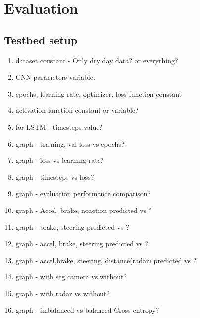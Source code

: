 \chapter{Evaluation}
\section{Testbed setup}
\begin{enumerate}
    \item dataset constant - Only dry day data?
        or everything?
    \item CNN parameters variable.
    \item epochs, learning rate, optimizer, loss function constant
    \item activation function constant or variable?
    \item for LSTM - timesteps value?
    \item graph - training, val loss vs epochs?
    \item graph - loss vs learning rate?
    \item graph - timesteps vs loss?
    \item graph - evaluation performance comparison?
    \item graph - Accel, brake, noaction predicted vs ?
    \item graph - brake, steering predicted vs ?
    \item graph - accel, brake, steering predicted vs ?
    \item graph - accel,brake, steering, distance(radar) predicted vs ?
    \item graph - with seg camera vs without?
    \item graph - with radar vs without?
    \item graph - imbalanced vs balanced Cross entropy?


\end{enumerate}

